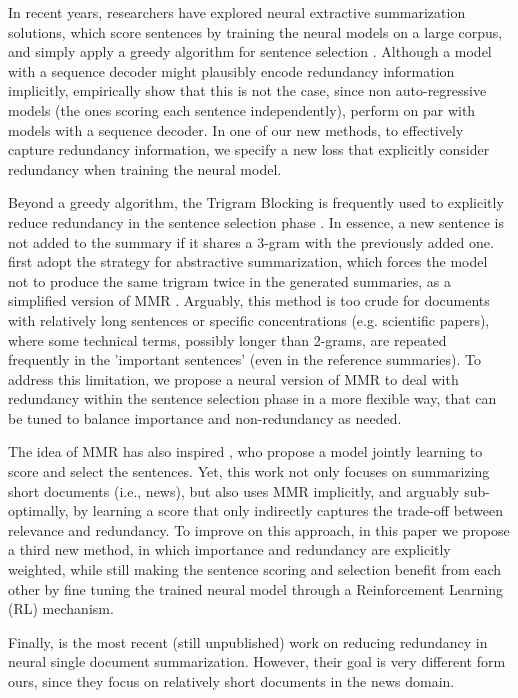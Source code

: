 \documentclass[11pt,a4paper]{article}
\begin{document}
In recent years, researchers have explored neural extractive summarization solutions, which score sentences by training the neural models on a large corpus, and simply apply a greedy algorithm for sentence selection \cite{cheng-lapata-2016-neural,summarunner}. Although a model with a sequence decoder might plausibly encode  redundancy information implicitly,  empirically show that this is not the case, since non auto-regressive models (the ones scoring each sentence independently), perform on par with models with a sequence decoder. In one of our new methods, to effectively capture redundancy information, we specify a new loss that explicitly consider redundancy when training the neural model.

Beyond a greedy algorithm, the Trigram Blocking is frequently used to explicitly reduce redundancy in the sentence selection phase \cite{liu-lapata-2019-text}. In essence, a new sentence is not added to the summary if it shares a 3-gram with the previously added one.
 first adopt the strategy for abstractive summarization, which forces the model not to produce the same trigram twice in the generated summaries, as a simplified version of MMR \cite{mmr}.  Arguably, this method is too crude for documents with relatively long sentences or specific concentrations (e.g. scientific papers), where some technical terms, possibly longer than 2-grams, are repeated frequently in the 'important sentences' (even in the reference summaries).
To address this limitation, we propose a neural version of MMR to deal with redundancy within the sentence selection phase in a more flexible way, that can be tuned to balance importance and non-redundancy as needed.


The idea of MMR has also inspired 
, who propose a model jointly learning to score and select the sentences. Yet, this work not only focuses on summarizing short documents (i.e., news), but also uses MMR implicitly, and arguably sub-optimally, by learning a score that only indirectly captures the trade-off between relevance and redundancy. To improve on this approach, in this paper we propose a third new method, in which importance and redundancy are explicitly weighted, while still making the sentence scoring and selection benefit from each other by fine tuning the trained neural model through a Reinforcement Learning (RL) mechanism.

Finally, \citet{Bi2020} is the most recent (still unpublished) work on reducing redundancy in neural single document summarization. However, their goal is very different form ours, since they focus on relatively short documents in the news domain.
\end{document}
